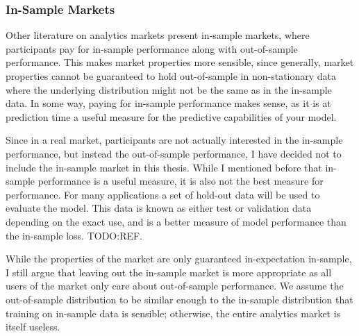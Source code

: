 \subsubsection{In-Sample Markets}

Other literature on analytics markets present in-sample markets, where
participants pay for in-sample performance along with out-of-sample
performance. This makes market properties more sensible, since generally,
market properties cannot be guaranteed to hold out-of-sample in non-stationary
data where the underlying distribution might not be the same as in the
in-sample data. In some way, paying for in-sample performance makes sense, as
it is at prediction time a useful measure for the predictive capabilities of
your model.

Since in a real market, participants are not actually interested in the
in-sample performance, but instead the out-of-sample performance, I have
decided not to include the in-sample market in this thesis. While I mentioned
before that in-sample performance is a useful measure, it is also not the best
measure for performance. For many applications a set of hold-out data will be
used to evaluate the model. This data is known as either test or validation
data depending on the exact use, and is a better measure of model performance
than the in-sample loss. TODO:REF.

While the properties of the market are only guaranteed in-expectation
in-sample, I still argue that leaving out the in-sample market is more
appropriate as all users of the market only care about out-of-sample
performance. We assume the out-of-sample distribution to be similar enough to
the in-sample distribution that training on in-sample data is sensible;
otherwise, the entire analytics market is itself useless.
